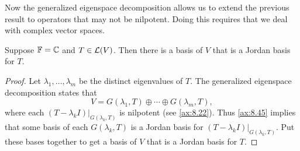 %
Now the generalized eigenspace decomposition allows us to extend the previous
result to operators that may not be nilpotent. Doing this requires that we deal
with complex vector spaces.

\begin{result}\label{ax:8.46}
Suppose $\mathbb{F}=\mathbb{C}$ and $T\in\mathcal{L}(V)$. Then there is a basis of $V$ that is a
Jordan basis for $T$.
\end{result}

\begin{proof}
Let $\lambda_1,\dots,\lambda_m$ be the distinct eigenvalues of $T$. The
generalized eigenspace decomposition states that
\[ V = G(\lambda_1,T)\oplus\cdots\oplus G(\lambda_m,T), \]
where each $(T-\lambda_kI)|_{G(\lambda_k,T)}$ is nilpotent (see
\ref{ax:8.22}). Thus \ref{ax:8.45} implies that some basis of each
$G(\lambda_k,T)$ is a Jordan basis for $(T-\lambda_kI)|_{G(\lambda_k,T)}$. Put
these bases together to get a basis of $V$ that is a Jordan basis for $T$.
\end{proof}

